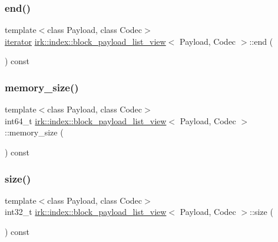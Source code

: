 \subsubsection{\texorpdfstring{end()}{end()}}
{\footnotesize\ttfamily template$<$class Payload, class Codec$>$ \\
\mbox{\hyperlink{classirk_1_1index_1_1block__payload__list__view_a201e879cc73a3fd9476a2e1043f4d74d}{iterator}} \mbox{\hyperlink{classirk_1_1index_1_1block__payload__list__view}{irk\+::index\+::block\+\_\+payload\+\_\+list\+\_\+view}}$<$ Payload, Codec $>$\+::end (\begin{DoxyParamCaption}{ }\end{DoxyParamCaption}) const\hspace{0.3cm}{\ttfamily [inline]}}

\mbox{\label{classirk_1_1index_1_1block__payload__list__view_a4d4e7da26085b5ad507e2e353c27f068}} 
\subsubsection{\texorpdfstring{memory\+\_\+size()}{memory\_size()}}
{\footnotesize\ttfamily template$<$class Payload, class Codec$>$ \\
int64\+\_\+t \mbox{\hyperlink{classirk_1_1index_1_1block__payload__list__view}{irk\+::index\+::block\+\_\+payload\+\_\+list\+\_\+view}}$<$ Payload, Codec $>$\+::memory\+\_\+size (\begin{DoxyParamCaption}{ }\end{DoxyParamCaption}) const\hspace{0.3cm}{\ttfamily [inline]}}

\mbox{\label{classirk_1_1index_1_1block__payload__list__view_a3def9dafc4213e24a9362f9ffbf9aebb}} 
\subsubsection{\texorpdfstring{size()}{size()}}
{\footnotesize\ttfamily template$<$class Payload, class Codec$>$ \\
int32\+\_\+t \mbox{\hyperlink{classirk_1_1index_1_1block__payload__list__view}{irk\+::index\+::block\+\_\+payload\+\_\+list\+\_\+view}}$<$ Payload, Codec $>$\+::size (\begin{DoxyParamCaption}{ }\end{DoxyParamCaption}) const\hspace{0.3cm}{\ttfamily [inline]}}

